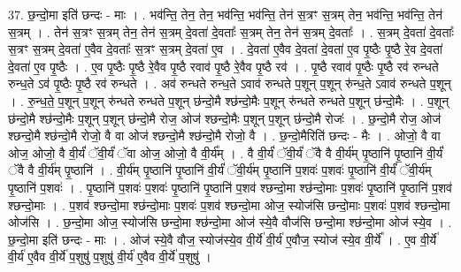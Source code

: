 \documentclass[17pt]{extarticle}
\begin{document}
37. छ॒न्दो॒मा इति॑ छन्दः - माः । . भव॑न्ति॒ तेन॒ तेन॒ भव॑न्ति॒ भव॑न्ति॒ तेन॑ स॒त्रꣳ स॒त्रम् तेन॒ भव॑न्ति॒ भव॑न्ति॒ तेन॑ स॒त्रम् । . तेन॑ स॒त्रꣳ स॒त्रम् तेन॒ तेन॑ स॒त्रम् दे॒वता॑ दे॒वताः᳚ स॒त्रम् तेन॒ तेन॑ स॒त्रम् दे॒वताः᳚ । . स॒त्रम् दे॒वता॑ दे॒वताः᳚ स॒त्रꣳ स॒त्रम् दे॒वता॑ ए॒वैव दे॒वताः᳚ स॒त्रꣳ स॒त्रम् दे॒वता॑ ए॒व । . दे॒वता॑ ए॒वैव दे॒वता॑ दे॒वता॑ ए॒व पृ॒ष्ठैः पृ॒ष्ठै रे॒व दे॒वता॑ दे॒वता॑ ए॒व पृ॒ष्ठैः । . ए॒व पृ॒ष्ठैः पृ॒ष्ठै रे॒वैव पृ॒ष्ठै रवाव॑ पृ॒ष्ठै रे॒वैव पृ॒ष्ठै रव॑ । . पृ॒ष्ठै रवाव॑ पृ॒ष्ठैः पृ॒ष्ठै रव॑ रुन्धते रुन्ध॒ते ऽव॑ पृ॒ष्ठैः पृ॒ष्ठै रव॑ रुन्धते । . अव॑ रुन्धते रुन्ध॒ते ऽवाव॑ रुन्धते प॒शून् प॒शून् रु॑न्ध॒ते ऽवाव॑ रुन्धते प॒शून् । . रु॒न्ध॒ते॒ प॒शून् प॒शून् रु॑न्धते रुन्धते प॒शून् छ॑न्दो॒मै श्छ॑न्दो॒मैः प॒शून् रु॑न्धते रुन्धते प॒शून् छ॑न्दो॒मैः । . प॒शून् छ॑न्दो॒मै श्छ॑न्दो॒मैः प॒शून् प॒शून् छ॑न्दो॒मै रोज॒ ओज॑ श्छन्दो॒मैः प॒शून् प॒शून् छ॑न्दो॒मै रोजः॑ । . छ॒न्दो॒मै रोज॒ ओज॑ श्छन्दो॒मै श्छ॑न्दो॒मै रोजो॒ वै वा ओज॑ श्छन्दो॒मै श्छ॑न्दो॒मै रोजो॒ वै । . छ॒न्दो॒मैरिति॑ छन्दः - मैः । . ओजो॒ वै वा ओज॒ ओजो॒ वै वी॒र्यं॑ ॅवी॒र्यं॑ ॅवा ओज॒ ओजो॒ वै वी॒र्य᳚म् । . वै वी॒र्यं॑ ॅवी॒र्यं॑ ॅवै वै वी॒र्य॑म् पृ॒ष्ठानि॑ पृ॒ष्ठानि॑ वी॒र्यं॑ ॅवै वै वी॒र्य॑म् पृ॒ष्ठानि॑ । . वी॒र्य॑म् पृ॒ष्ठानि॑ पृ॒ष्ठानि॑ वी॒र्यं॑ ॅवी॒र्य॑म् पृ॒ष्ठानि॑ प॒शवः॑ प॒शवः॑ पृ॒ष्ठानि॑ वी॒र्यं॑ ॅवी॒र्य॑म् पृ॒ष्ठानि॑ प॒शवः॑ । . पृ॒ष्ठानि॑ प॒शवः॑ प॒शवः॑ पृ॒ष्ठानि॑ पृ॒ष्ठानि॑ प॒शव॑ श्छन्दो॒मा श्छ॑न्दो॒माः प॒शवः॑ पृ॒ष्ठानि॑ पृ॒ष्ठानि॑ प॒शव॑ श्छन्दो॒माः । . प॒शव॑ श्छन्दो॒मा श्छ॑न्दो॒माः प॒शवः॑ प॒शव॑ श्छन्दो॒मा ओज॒ स्योज॑सि छन्दो॒माः प॒शवः॑ प॒शव॑ श्छन्दो॒मा ओज॑सि । . छ॒न्दो॒मा ओज॒ स्योज॑सि छन्दो॒मा श्छ॑न्दो॒मा ओज॑ स्ये॒वै वौज॑सि छन्दो॒मा श्छ॑न्दो॒मा ओज॑ स्ये॒व । . छ॒न्दो॒मा इति॑ छन्दः - माः । . ओज॑ स्ये॒वै वौज॒ स्योज॑स्ये॒व वी॒र्ये॑ वी॒र्य॑ ए॒वौज॒ स्योज॑ स्ये॒व वी॒र्ये᳚ । . ए॒व वी॒र्ये॑ वी॒र्य॑ ए॒वैव वी॒र्ये॑ प॒शुषु॑ प॒शुषु॑ वी॒र्य॑ ए॒वैव वी॒र्ये॑ प॒शुषु॑ । \newline
\pagebreak
{}
\end{document}
